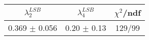 \begin{tabular}{c|c||c}
$\lambda_{2}^{LSB}$ & $\lambda_4^{LSB}$ & $\chi^{2}$/ndf \\
\hline
0.369 $\pm$ 0.056 & 0.20 $\pm$ 0.13 & 129/99\\
\end{tabular}
